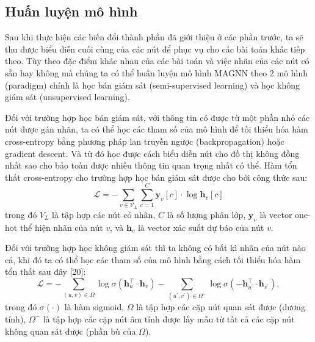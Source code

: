 \subsection{Huấn luyện mô hình}
Sau khi thực hiện các biến đổi thành phần đã giới thiệu ở các phần trước, ta sẽ thu được biểu diễn cuối cùng của các nút để phục vụ cho các bài toán khác tiếp theo. Tùy theo đặc điểm khác nhau của các bài toán và việc nhãn của các nút có sẵn hay không mà chúng ta có thể huấn luyện mô hình MAGNN theo 2 mô hình (paradigm) chính là học bán giám sát (semi-supervised learning) và học không giám sát (unsupervised learning).

Đối với trường hợp học bán giám sát, với thông tin có được từ một phần nhỏ các nút được gán nhãn, ta có thể học các tham số của mô hình để tối thiểu hóa hàm cross-entropy bằng phương pháp lan truyền ngược (backpropagation) hoặc gradient descent. Và từ đó học được cách biểu diễn nút cho đồ thị không đồng nhất sao cho bảo toàn được nhiều thông tin quan trọng nhất có thể. Hàm tổn thất cross-entropy cho trường hợp học bán giám sát được cho bởi công thức sau:
\begin{equation}
    \mathcal{L}=-\sum_{v \in \mathcal{V}_{L}} \sum_{c=1}^{C} \mathbf{y}_{v}[c] \cdot \log \mathbf{h}_{v}[c]
\end{equation}
trong đó $V_{L}$ là tập hợp các nút có nhãn, $C$ là số lượng phân lớp, $\mathbf{y}_{v}$ là vector one-hot thể hiện nhãn của nút $v$, và $\mathbf{h}_{v}$ là vector xác suất dự báo của nút $v$.

Đối với trường hợp học không giám sát thì ta không có bất kì nhãn của nút nào cả, khi đó ta có thể học các tham số của mô hình bằng cách tối thiểu hóa hàm tổn thất sau đây [20]:
\begin{equation}
    \mathcal{L}=-\sum_{(u, v) \in \Omega} \log \sigma\left(\mathbf{h}_{u}^{\top} \cdot \mathbf{h}_{v}\right)-\sum_{\left(u^{\prime}, v^{\prime}\right) \in \Omega^{-}} \log \sigma\left(-\mathbf{h}_{u^{\prime}}^{\top} \cdot \mathbf{h}_{v^{\prime}}\right),
\end{equation}
trong đó $\sigma(\cdot)$ là hàm sigmoid, $\Omega$ là tập hợp các cặp nút quan sát được (dương tính), $\Omega^{-}$ là tập hợp các cặp nút âm tính được lấy mẫu từ tất cả các cặp nút không quan sát được (phần bù của $\Omega$).
